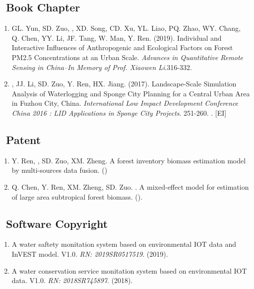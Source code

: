 \subsection*{\texorpdfstring{\faBook\ Book Chapter}{Book Chapter}}
\begin{enumerate}
\item
    GL. Yun, SD. Zuo, \Shaoqing, XD. Song, CD. Xu, YL. Liao, PQ. Zhao, WY. Chang, Q. Chen, YY. Li, JF. Tang, W. Man, Y. Ren. (2019).
	Individual and Interactive Influences of Anthropogenic and Ecological Factors on Forest PM2.5 Concentrations at an Urban Scale.
    \textit{Advances in Quantitative Remote Sensing in China–In Memory of Prof. Xiaowen Li}.316-332.
\item
    \Shaoqing, JJ. Li, SD. Zuo, Y. Ren, HX. Jiang. (2017).
	Landscape-Scale Simulation Analysis of Waterlogging and Sponge City Planning for a Central Urban Area in Fuzhou City, China.
    \textit{International Low Impact Development Conference China 2016 : LID Applications in Sponge City Projects}. 251-260.
    . [EI]
\end{enumerate}

\subsection*{\texorpdfstring{\faBook\ Patent}{Patent}}
\begin{enumerate}
\item
     Y. Ren, \Shaoqing, SD. Zuo, XM. Zheng.
     A forest inventory biomass estimation model by multi-sources data fusion.
     (\Review)
\item
     Q. Chen, Y. Ren, XM. Zheng, SD. Zuo. \Shaoqing.
     A mixed-effect model for estimation of large area subtropical forest biomass.
     (\Review).
\end{enumerate}

\subsection*{\texorpdfstring{\faBook\ Software Copyright}{Software Copyright}}
\begin{enumerate}
\item
    A water saftety monitation system based on environmental IOT data and InVEST model. V1.0.
    \textit{RN: 2019SR0517519}. (2019).
\item
    A water conservation service monitation system based on environmental IOT data. V1.0.
    \textit{RN: 2018SR745897}. (2018).
\end{enumerate}

